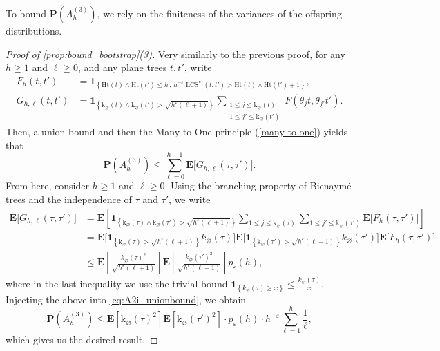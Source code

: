 \documentclass[11pt,reqno]{amsart}
\newcommand{\1}{\mathbf{1}}
\newcommand{\0}{\mathbf{0}}
\newcommand{\E}{{\mathbf E}}
\newcommand{\I}[1]{{\mathbf 1}_{\left\{#1\right\}}}
\newcommand{\prob}{\mathbf{P}}
\newcommand{\ex}{\mathbf{E}}
\newcommand{\Ht}{\mathrm{Ht}}
\newcommand{\rk}{\mathrm{k}}
\newcommand{\LCS}{\operatorname{LCS}}
\renewcommand{\emptyset}{\varnothing}
\begin{document}
To bound $\prob(A_h^{(3)})$, we rely on the finiteness of the variances of the offspring distributions.

\begin{proof}[Proof of \cref{prop:bound_bootstrap}(3)]
    Very similarly to the previous proof, for any $h\geq 1$ and $\ell\geq 0$, and any plane trees $t,t'$, write
    \begin{align*}
        F_{h}(t,t')&=\I{\Ht(t)\wedge \Ht(t')\leq h\, ;\, h^{-\varepsilon}\LCS^\bullet(t,t')> \Ht(t)\wedge\Ht(t')+1},\\
        G_{h,\ell}(t,t')&=\I{\rk_\varnothing(t)\wedge \rk_\varnothing(t')>\sqrt{h^\varepsilon(\ell+1)}}\sum_{\substack{1 \leq j \leq \rk_\emptyset(t) \\ 1 \leq  j' \leq \rk_{\emptyset}(t')}}\!\!  F(\theta_j t,\theta_{j'}t').
    \end{align*}
    Then, a union bound and then the Many-to-One principle (\cref{many-to-one}) yields that
    \begin{equation}\label{eq:A2i_unionbound}
        \prob(A_h^{(3)}) \leq \sum_{\ell = 0}^{h-1} \E\big[G_{h,\ell}(\tau,\tau')\big].
    \end{equation}
    From here, consider $h\geq 1$ and $\ell\geq 0$. Using the branching property of Bienaym\'{e} trees and the independence of $\tau$ and $\tau'$, we write
    \begin{align*}
    \E\big[G_{h,\ell}(\tau,\tau')\big] &= \ex\left[ \I{\rk_\varnothing(\tau)\wedge \rk_\varnothing(\tau')>\sqrt{h^\varepsilon(\ell+1)}}\sum_{1 \leq j \leq \rk_\emptyset(\tau)}\sum_{1 \leq j' \leq \rk_\emptyset(\tau')} \E\big[F_h(\tau,\tau')\big] \right] \\
    &= \E\Big[\I{\rk_\varnothing(\tau)>\sqrt{h^\varepsilon(\ell+1)}}k_\varnothing(\tau)\Big] \E\Big[\I{\rk_\varnothing(\tau')>\sqrt{h^\varepsilon(\ell+1)}}k_\varnothing(\tau')\Big] \E\big[F_h(\tau,\tau')\big]\\
    &\leq \ex\left[ \frac{k_\emptyset(\tau)^2}{\sqrt{h^\varepsilon (\ell+1)}} \right] \ex\left[ \frac{k_\emptyset(\tau')^2}{\sqrt{h^\varepsilon (\ell+1)}} \right] p_\varepsilon(h),
    \end{align*}
    where in the last inequality we use the trivial bound $\I{k_\emptyset(\tau) \geq x} \leq \frac{k_\emptyset(\tau)}{x}$. Injecting the above into \eqref{eq:A2i_unionbound}, we obtain
    $$
    \prob(A_h^{(3)}) \leq \ex[\rk_\emptyset(\tau)^2]\ex[\rk_\emptyset(\tau')^2]\cdot  p_\varepsilon(h)\cdot h^{-\varepsilon}\sum_{\ell = 1}^{h} \frac{1}{\ell},
    $$
    which gives us the desired result.
\end{proof}
\end{document}
